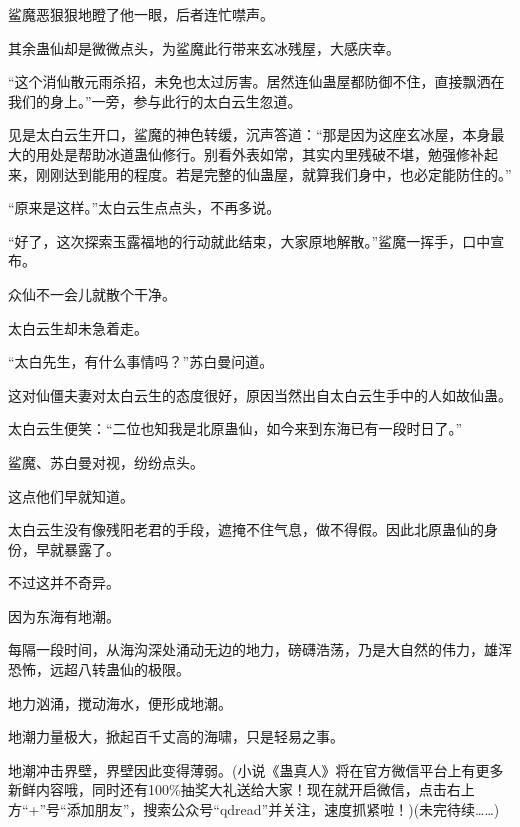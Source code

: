 \begin{this_body}
鲨魔恶狠狠地瞪了他一眼，后者连忙噤声。

其余蛊仙却是微微点头，为鲨魔此行带来玄冰残屋，大感庆幸。

“这个消仙散元雨杀招，未免也太过厉害。居然连仙蛊屋都防御不住，直接飘洒在我们的身上。”一旁，参与此行的太白云生忽道。

见是太白云生开口，鲨魔的神色转缓，沉声答道：“那是因为这座玄冰屋，本身最大的用处是帮助冰道蛊仙修行。别看外表如常，其实内里残破不堪，勉强修补起来，刚刚达到能用的程度。若是完整的仙蛊屋，就算我们身中，也必定能防住的。”

“原来是这样。”太白云生点点头，不再多说。

“好了，这次探索玉露福地的行动就此结束，大家原地解散。”鲨魔一挥手，口中宣布。

众仙不一会儿就散个干净。

太白云生却未急着走。

“太白先生，有什么事情吗？”苏白曼问道。

这对仙僵夫妻对太白云生的态度很好，原因当然出自太白云生手中的人如故仙蛊。

太白云生便笑：“二位也知我是北原蛊仙，如今来到东海已有一段时日了。”

鲨魔、苏白曼对视，纷纷点头。

这点他们早就知道。

太白云生没有像残阳老君的手段，遮掩不住气息，做不得假。因此北原蛊仙的身份，早就暴露了。

不过这并不奇异。

因为东海有地潮。

每隔一段时间，从海沟深处涌动无边的地力，磅礴浩荡，乃是大自然的伟力，雄浑恐怖，远超八转蛊仙的极限。

地力汹涌，搅动海水，便形成地潮。

地潮力量极大，掀起百千丈高的海啸，只是轻易之事。

地潮冲击界壁，界壁因此变得薄弱。(小说《蛊真人》将在官方微信平台上有更多新鲜内容哦，同时还有100\%抽奖大礼送给大家！现在就开启微信，点击右上方“+”号“添加朋友”，搜索公众号“qdread”并关注，速度抓紧啦！)(未完待续……)

\end{this_body}

